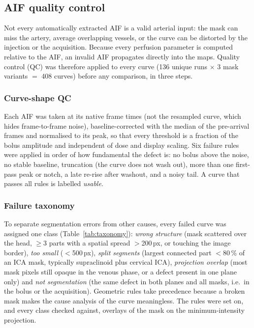 
\subsection{AIF quality control}
\label{sec:aif_qc}

Not every automatically extracted AIF is a valid arterial input: the mask can miss the artery, average
overlapping vessels, or the curve can be distorted by the injection or the acquisition. Because every
perfusion parameter is computed relative to the AIF, an invalid AIF propagates directly into the maps.
Quality control (QC) was therefore applied to every curve (136 unique runs $\times$ 3 mask variants
$=$ 408 curves) before any comparison, in three steps.

\subsubsection{Curve-shape QC}
Each AIF was taken at its native frame times (not the resampled curve, which hides frame-to-frame noise),
baseline-corrected with the median of the pre-arrival frames and normalised to its peak, so that every
threshold is a fraction of the bolus amplitude and independent of dose and display scaling. Six failure rules
were applied in order of how fundamental the defect is: no bolus above the noise, no stable baseline,
truncation (the curve does not wash out), more than one first-pass peak or notch, a late re-rise after
washout, and a noisy tail. A curve that passes all rules is labelled \emph{usable}.

\subsubsection{Failure taxonomy}
To separate segmentation errors from other causes, every failed curve was assigned one class
(Table~\ref{tab:taxonomy}): \emph{wrong structure} (mask scattered over the head, $\geq$3 parts with a spatial
spread $>$200\,px, or touching the image border), \emph{too small} ($<$500\,px), \emph{split segments}
(largest connected part $<$80\,\% of an ICA mask, typically supraclinoid plus cervical ICA),
\emph{projection overlap} (most mask pixels still opaque in the venous phase, or a defect present in one
plane only) and \emph{not segmentation} (the same defect in both planes and all masks, i.e.\ in the bolus or
the acquisition). Geometric rules take precedence because a broken mask makes the cause analysis of the
curve meaningless. The rules were set on, and every class checked against, overlays of the mask on the
minimum-intensity projection.

